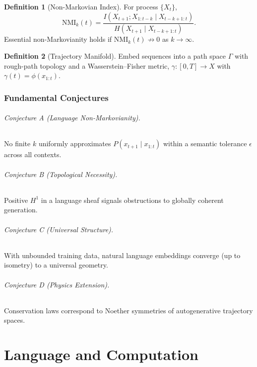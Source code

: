 \documentclass[12pt,a4paper]{article}
\theoremstyle{definition}
\newtheorem{definition}{Definition}[section]
\begin{document}
\begin{definition}[Non-Markovian Index]
For process $\{X_t\}$,
\[
\mathrm{NMI}_k(t)=\frac{I(X_{t+1};X_{1:t-k}\mid X_{t-k+1:t})}{H(X_{t+1}\mid X_{t-k+1:t})}.
\]
Essential non-Markovianity holds if $\mathrm{NMI}_k(t)\not\to 0$ as $k\to\infty$.
\end{definition}

\begin{definition}[Trajectory Manifold]
Embed sequences into a path space $\Gamma$ with rough-path topology and a Wasserstein–Fisher metric, $\gamma:[0,T]\!\to\!X$ with $\gamma(t)=\phi(x_{1:t})$.
\end{definition}

\section{Fundamental Conjectures}
\paragraph{Conjecture A (Language Non-Markovianity).}
No finite $k$ uniformly approximates $P(x_{t+1}\mid x_{1:t})$ within a semantic tolerance $\epsilon$ across all contexts.

\paragraph{Conjecture B (Topological Necessity).}
Positive $H^1$ in a language sheaf signals obstructions to globally coherent generation.

\paragraph{Conjecture C (Universal Structure).}
With unbounded training data, natural language embeddings converge (up to isometry) to a universal geometry.

\paragraph{Conjecture D (Physics Extension).}
Conservation laws correspond to Noether symmetries of autogenerative trajectory spaces.

\part{Language and Computation}
\end{document}
